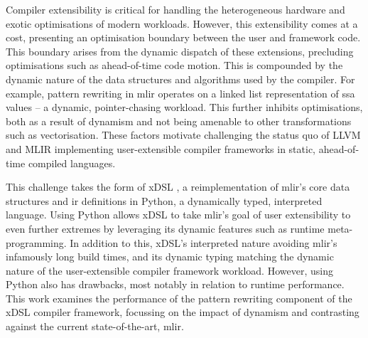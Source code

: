Compiler extensibility is critical for handling the heterogeneous hardware and exotic optimisations of modern workloads.
However, this extensibility comes at a cost, presenting an optimisation boundary between the user and framework code. This boundary arises from the dynamic dispatch of these extensions, precluding optimisations such as ahead-of-time code motion.
This is compounded by the dynamic nature of the data structures and algorithms used by the compiler. For example, pattern rewriting in \ac{mlir} operates on a linked list representation of \ac{ssa} values -- a dynamic, pointer-chasing workload.
This further inhibits optimisations, both as a result of dynamism and not being amenable to other transformations such as vectorisation.
These factors motivate challenging the status quo of LLVM and MLIR implementing user-extensible compiler frameworks in static, ahead-of-time compiled languages.







This challenge takes the form of xDSL \cite{fehrXDSLSidekickCompilation2025}, a reimplementation of \ac{mlir}'s core data structures and \ac{ir} definitions in Python, a dynamically typed, interpreted language.
Using Python allows xDSL to take \ac{mlir}'s goal of user extensibility to even further extremes by leveraging its dynamic features such as runtime meta-programming.
In addition to this, xDSL's interpreted nature avoiding \ac{mlir}'s infamously long build times, and its dynamic typing matching the dynamic nature of the user-extensible compiler framework workload.
However, using Python also has drawbacks, most notably in relation to runtime performance.
This work examines the performance of the pattern rewriting component of the xDSL compiler framework, focussing on the impact of dynamism and contrasting against the current state-of-the-art, \ac{mlir}.




